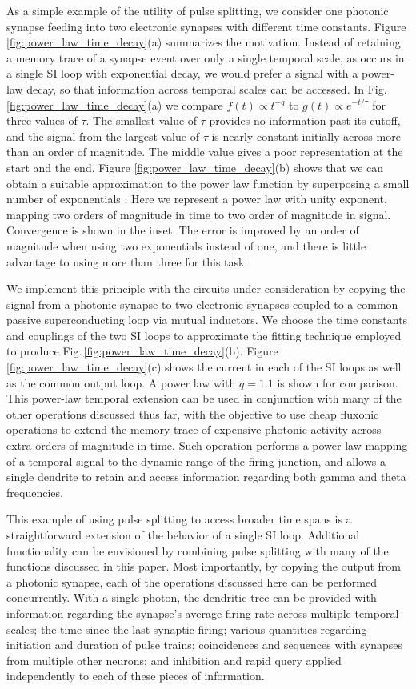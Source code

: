 \documentclass[twocolumn]{article}
\begin{document}
As a simple example of the utility of pulse splitting, we consider one photonic synapse feeding into two electronic synapses with different time constants. Figure \ref{fig:power_law_time_decay}(a) summarizes the motivation. Instead of retaining a memory trace of a synapse event over only a single temporal scale, as occurs in a single SI loop with exponential decay, we would prefer a signal with a power-law decay, so that information across temporal scales can be accessed. In Fig.\,\ref{fig:power_law_time_decay}(a) we compare $f(t) \propto t^{-q}$ to $g(t) \propto e^{-t/\tau}$ for three values of $\tau$. The smallest value of $\tau$ provides no information past its cutoff, and the signal from the largest value of $\tau$ is nearly constant initially across more than an order of magnitude. The middle value gives a poor representation at the start and the end. Figure \ref{fig:power_law_time_decay}(b) shows that we can obtain a suitable approximation to the power law function by superposing a small number of exponentials \cite{be2007}. Here we represent a power law with unity exponent, mapping two orders of magnitude in time to two order of magnitude in signal. Convergence is shown in the inset. The error is improved by an order of magnitude when using two exponentials instead of one, and there is little advantage to using more than three for this task. 

We implement this principle with the circuits under consideration by copying the signal from a photonic synapse to two electronic synapses coupled to a common passive superconducting loop via mutual inductors. We choose the time constants and couplings of the two SI loops to approximate the fitting technique employed to produce Fig.\,\ref{fig:power_law_time_decay}(b). Figure \ref{fig:power_law_time_decay}(c) shows the current in each of the SI loops as well as the common output loop. A power law with $q = 1.1$ is shown for comparison. This power-law temporal extension can be used in conjunction with many of the other operations discussed thus far, with the objective to use cheap fluxonic operations to extend the memory trace of expensive photonic activity across extra orders of magnitude in time. Such operation performs a power-law mapping of a temporal signal to the dynamic range of the firing junction, and allows a single dendrite to retain and access information regarding both gamma and theta frequencies. 

This example of using pulse splitting to access broader time spans is a straightforward extension of the behavior of a single SI loop. Additional functionality can be envisioned by combining pulse splitting with many of the functions discussed in this paper. Most importantly, by copying the output from a photonic synapse, each of the operations discussed here can be performed concurrently. With a single photon, the dendritic tree can be provided with information regarding the synapse's average firing rate across multiple temporal scales; the time since the last synaptic firing; various quantities regarding initiation and duration of pulse trains; coincidences and sequences with synapses from multiple other neurons; and inhibition and rapid query applied independently to each of these pieces of information.
\end{document}

